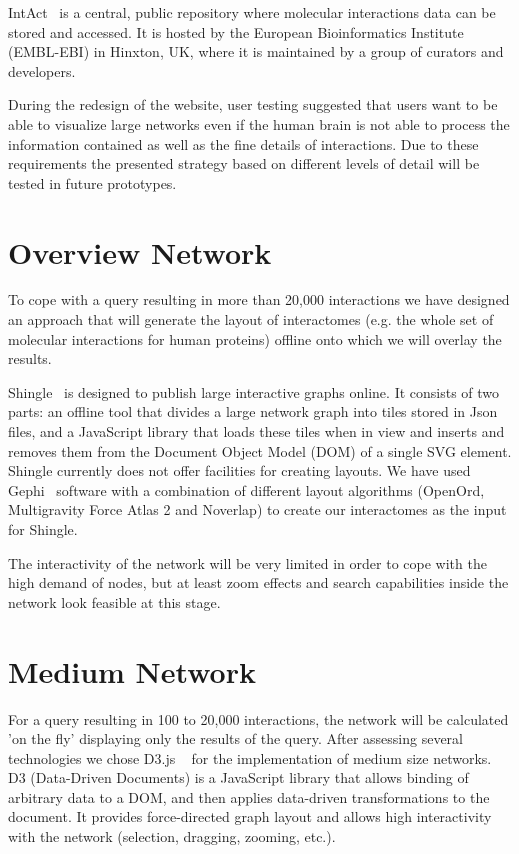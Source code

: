 \documentclass[runningheads]{llncs}
\begin{document}
IntAct~\cite{ref_article4} is a central, public repository where molecular interactions data can be stored and accessed. It is hosted by the European Bioinformatics Institute (EMBL-EBI) in Hinxton, UK, where it is maintained by a group of curators and developers. 

During the redesign of the website, user testing suggested that users want to be able to visualize large networks even if the human brain is not able to process the information contained as well as the fine details of interactions. Due to these requirements the presented strategy based on different levels of detail will be tested in future prototypes.

\section{Overview Network}
To cope with a query resulting in more than 20,000 interactions we have designed an approach that will generate the layout of interactomes (e.g. the whole set of molecular interactions for human proteins) offline onto which we will overlay the results.

Shingle~\cite{ref_url1} is designed to publish large interactive graphs online. It consists of two parts: an offline tool that divides a large network graph into tiles stored in Json files, and a JavaScript library that loads these tiles when in view and inserts and removes them from the Document Object Model (DOM) of a single SVG element. Shingle currently does not offer facilities for creating layouts. We have used Gephi~\cite{ref_proc1} software with a combination of different layout algorithms (OpenOrd, Multigravity Force Atlas 2 and Noverlap) to create our interactomes as the input for Shingle.

The interactivity of the network will be very limited in order to cope with the high demand of nodes, but at least zoom effects and search capabilities inside the network look feasible at this stage. 

\section{Medium Network}
For a query resulting in 100 to 20,000 interactions, the network will be calculated 'on the fly' displaying only the results of the query.
After assessing several technologies we chose D3.js ~\cite{ref_article5,ref_url2} for the implementation of medium size networks. D3 (Data-Driven Documents) is a JavaScript library that allows binding of arbitrary data to a DOM, and then applies data-driven transformations to the document. It provides force-directed graph layout and allows high interactivity with the network (selection, dragging, zooming, etc.).
\end{document}
